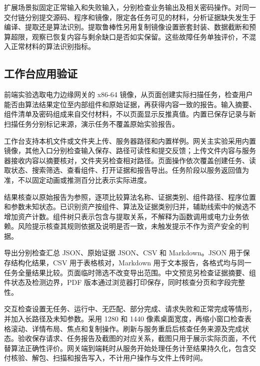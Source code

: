 扩展场景拟固定正常输入和失败输入，分别检查业务输出及相关密码操作。对同一交付链分别提交源码、程序和镜像，限定各任务可见的材料，分析证据缺失发生于编译、提取还是算法识别。提取鲁棒性另用复制镜像设置嵌套封装、数据截断和预算超限，观察已恢复内容与剩余缺口是否如实保留。这些故障任务单独评价，不混入正常材料的算法识别指标。

\subsection{工作台应用验证}

前端实验选取电力边缘网关的 x86-64 镜像，从页面创建实际扫描任务，检查用户能否由算法结果定位至内部组件和原始证据，再获得内容一致的报告。输入摘要、组件清单及密码组成来自交付材料，不以页面显示反推真值。内置已保存记录与新扫描任务分别标记来源，演示任务不覆盖原始实验报告。

工作台支持本机文件或文件夹上传、服务器路径和内置样例。网关主实验采用内置镜像，其他入口分别检查输入保存、路径可读性和提交反馈；上传文件内容与服务器接收内容以摘要核对，文件夹另检查相对路径。页面操作依次覆盖创建任务、读取状态、搜索筛选、查看组件、打开证据和报告导出。任务阶段以服务返回值为准，不以固定动画或推测百分比表示实际进度。

结果核查以原始报告为参照，逐项比较算法名称、证据类别、组件路径、程序位置和参数未知状态。已识别资产按组件、算法及证据类别归并，辅助线索中的候选不增加资产计数。组件树只表示包含与提取关系，不解释为函数调用或电力业务依赖。风险提示核查其规则依据及说明是否一致，未触发提示不作为资产安全的判据。

导出分别检查汇总 JSON、原始证据 JSON、CSV 和 Markdown。JSON 用于保存结构化结果，CSV 用于表格核对，Markdown 用于文本报告，各格式均与同一任务全量结果比较。页面临时筛选不改变导出范围。中文预览另检查证据摘要、组件状态及检测边界，PDF 版本通过浏览器打印保存，同时核查分页和字段完整性。

交互检查设置无任务、运行中、无匹配、部分完成、请求失败和正常完成等情形，并加入长路径及未知参数。采用 1280 和 1440 像素桌面宽度，再缩小窗口检查表格滚动、详情布局、焦点和复制操作。刷新与服务重启后核查任务来源及完成状态。验收保存请求、任务报告及截图的对应关系，截图只用于展示实际页面，不代替算法正确性评价。网关端到端耗时从服务开始处理任务计至结果持久化，包含交付核验、解包、扫描和报告写入，不计用户操作与文件上传时间。


